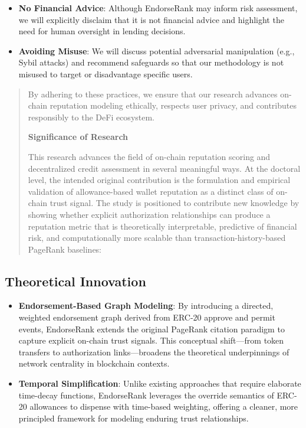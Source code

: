 \documentclass[
]{article}
\begin{document}
\begin{itemize}
\item
  \textbf{No Financial Advice}: Although EndorseRank may inform risk assessment, we will explicitly disclaim that it is not financial advice and highlight the need for human oversight in lending decisions.
\item
  \textbf{Avoiding Misuse}: We will discuss potential adversarial manipulation (e.g., Sybil attacks) and recommend safeguards so that our methodology is not misused to target or disadvantage specific users.
\end{itemize}

\begin{quote}
By adhering to these practices, we ensure that our research advances on-chain reputation modeling ethically, respects user privacy, and contributes responsibly to the DeFi ecosystem.

\textbf{Significance of Research}

This research advances the field of on-chain reputation scoring and decentralized credit assessment in several meaningful ways. At the doctoral level, the intended original contribution is the formulation and empirical validation of allowance-based wallet reputation as a distinct class of on-chain trust signal. The study is positioned to contribute new knowledge by showing whether explicit authorization relationships can produce a reputation metric that is theoretically interpretable, predictive of financial risk, and computationally more scalable than transaction-history-based PageRank baselines:
\end{quote}

\subsection{Theoretical Innovation}\label{theoretical-innovation}

\begin{itemize}
\item
  \textbf{Endorsement-Based Graph Modeling}: By introducing a directed, weighted endorsement graph derived from ERC-20 approve and permit events, EndorseRank extends the original PageRank citation paradigm to capture explicit on-chain trust signals. This conceptual shift---from token transfers to authorization links---broadens the theoretical underpinnings of network centrality in blockchain contexts.
\item
  \textbf{Temporal Simplification}: Unlike existing approaches that require elaborate time-decay functions, EndorseRank leverages the override semantics of ERC-20 allowances to dispense with time-based weighting, offering a cleaner, more principled framework for modeling enduring trust relationships.
\end{itemize}
\end{document}
